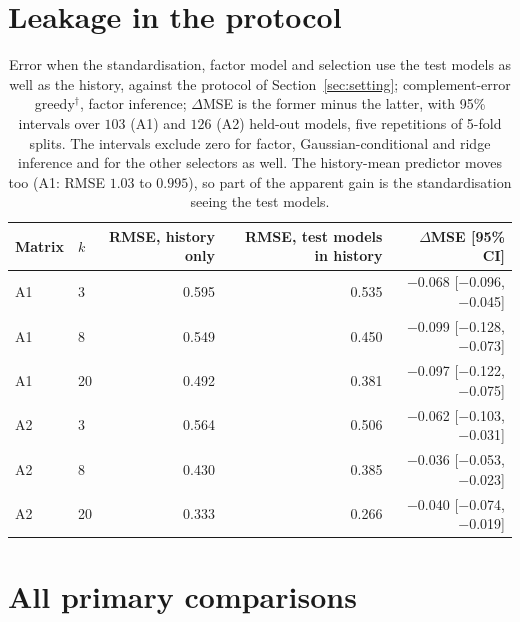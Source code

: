 \section{Leakage in the protocol}
\label{app:protocol}
\begin{table}[h]
\centering\scriptsize\setlength{\tabcolsep}{4pt}
\begin{tabular}{@{}llrrr@{}}
\toprule
Matrix & $k$ & RMSE, history only & RMSE, test models in history & $\Delta$MSE [95\% CI] \\
\midrule
A1 & 3 & 0.595 & 0.535 & $-$0.068 [$-$0.096, $-$0.045] \\
A1 & 8 & 0.549 & 0.450 & $-$0.099 [$-$0.128, $-$0.073] \\
A1 & 20 & 0.492 & 0.381 & $-$0.097 [$-$0.122, $-$0.075] \\
A2 & 3 & 0.564 & 0.506 & $-$0.062 [$-$0.103, $-$0.031] \\
A2 & 8 & 0.430 & 0.385 & $-$0.036 [$-$0.053, $-$0.023] \\
A2 & 20 & 0.333 & 0.266 & $-$0.040 [$-$0.074, $-$0.019] \\
\bottomrule
\end{tabular}
\caption{Error when the standardisation, factor model and selection use the test models as well as the history, against the protocol of Section~\ref{sec:setting}; complement-error greedy$^\dagger$, factor inference; $\Delta$MSE is the former minus the latter, with 95\% intervals over $103$ (A1) and $126$ (A2) held-out models, five repetitions of 5-fold splits. The intervals exclude zero for factor, Gaussian-conditional and ridge inference and for the other selectors as well. The history-mean predictor moves too (A1: RMSE $1.03$ to $0.995$), so part of the apparent gain is the standardisation seeing the test models.}
\end{table}

\section{All primary comparisons}
\label{app:t2full}
\begin{table}[h]
\centering\scriptsize\setlength{\tabcolsep}{3pt}

\caption{The comparisons of the primary family on each MTEB matrix (twelve on A1 and A2, of which Table~\ref{tab:t2} shows eight; B has three repetitions of five folds, no cluster or leverage selection, and a Holm family of 33 tests): relative change in held-out MSE (\%), first named minus second; conventions as in Table~\ref{tab:t2}.}
\label{tab:t2full}
\end{table}

